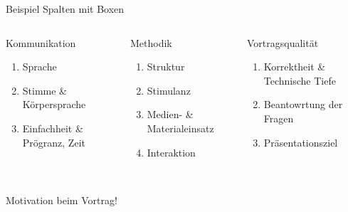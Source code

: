 \documentclass[aspectratio=169,xcolor=dvipsnames, t]{beamer}
\begin{document}
	\begin{frame}{Beispiel Spalten mit Boxen}
		\begin{columns}
			\begin{column}{0.3\textwidth}
				\begin{block}{Kommunikation}
					\begin{enumerate}
						\item Sprache
						\item Stimme \& K\"orpersprache
						\item Einfachheit \& Pr\"ogranz, Zeit
					\end{enumerate}
				\end{block}
			\end{column}
			\pause
			\begin{column}{0.3\textwidth}
				\begin{block}{Methodik}
					\begin{enumerate}
						\item Struktur
						\item Stimulanz
						\item Medien- \& Materialeinsatz
						\item Interaktion
					\end{enumerate}
				\end{block}
			\end{column}
			\pause
			\begin{column}{0.3\textwidth}
				\begin{block}{Vortragsqualit\"at}
					\begin{enumerate}
						\item Korrektheit \& Technische Tiefe
						\item Beantowrtung der Fragen
						\item Pr\"asentationsziel
					\end{enumerate}
				\end{block}
			\end{column}
		\end{columns} ~\\
		Motivation beim Vortrag!
	\end{frame}
\end{document}
